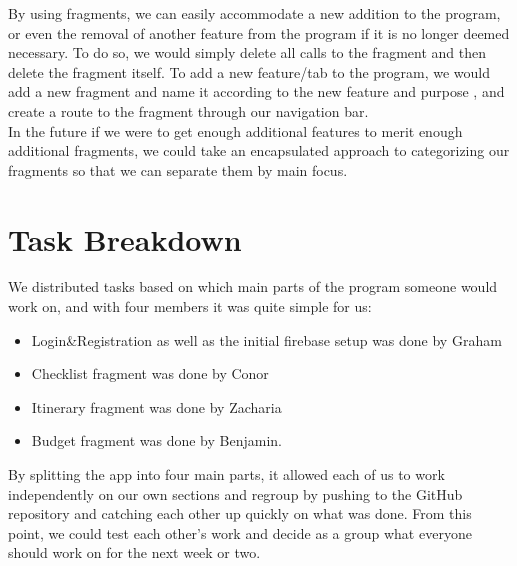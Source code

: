 \documentclass[12pt]{article}
\begin{document}
	By using fragments, we can easily accommodate a new addition to the program, or even the removal of another feature from the program if it is no longer deemed necessary.
	To do so, we would simply delete all calls to the fragment and then delete the fragment itself.
	To add a new feature/tab to the program, we would add a new fragment and name it according to the new feature and purpose , and create a route to the fragment through our navigation bar.\\


	In the future if we were to get enough additional features to merit enough additional fragments, we could take an encapsulated approach to categorizing our fragments so that we can separate them by main focus.


	\pagebreak
	\section*{Task Breakdown}
	We distributed tasks based on which main parts of the program someone would work on, and with four members it was quite simple for us:
	\begin{itemize}
		\item Login\&Registration as well as the initial firebase setup was done by Graham
		\item Checklist fragment was done by Conor
		\item Itinerary fragment was done by Zacharia
		\item Budget fragment was done by Benjamin.
	\end{itemize}
	By splitting the app into four main parts, it allowed each of us to work independently on our own sections and regroup by pushing to the GitHub repository and catching each other up quickly on what was done.
	From this point, we could test each other's work and decide as a group what everyone should work on for the next week or two.
\end{document}
